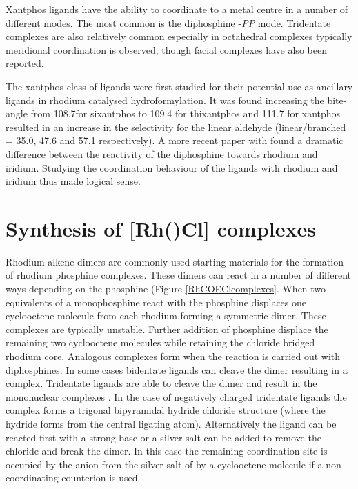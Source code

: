 

Xantphos ligands have the ability to coordinate to a metal centre in a number of different modes.  The most common is the diphosphine -\emph{PP\textprime} mode.  Tridentate complexes are also relatively common especially in octahedral complexes typically meridional \POP{} coordination is observed, though facial complexes have also been reported.\cite{Dallanegra2012, Pawley2012}

The xantphos class of ligands were first studied for their potential use as ancillary ligands in rhodium catalysed hydroformylation\cite{Kranenburg1995}.  It was found increasing the bite-angle from 108.7\degrees for sixantphos to 109.4 \degrees for thixantphos and 111.7 \degrees for xantphos resulted in an increase in the selectivity for the linear aldehyde (linear/branched = 35.0, 47.6 and 57.1 respectively).  A more recent paper with \iPrxantphos{} found a dramatic difference between the reactivity of the diphosphine towards rhodium and iridium.  Studying the coordination behaviour of the \tBuxantphos{} ligands with rhodium and iridium thus made logical sense.

\section{Synthesis of [Rh(\tBuxantphosk)Cl] complexes}
\label{section:rhodiumchloride}

Rhodium alkene dimers are commonly used starting materials for the formation of rhodium phosphine complexes.  These dimers can react in a number of different ways depending on the phosphine (Figure \ref{RhCOEClcomplexes}.  When two equivalents of a monophosphine react with  the phosphine displaces one cyclooctene molecule from each rhodium forming a symmetric dimer.\cite{Canepa2003}  These complexes are typically unstable.  Further addition of phosphine displace the remaining two cyclooctene molecules while retaining the chloride bridged rhodium core.\cite{Bleeke1986}  Analogous complexes form when the reaction is carried out with diphosphines.\cite{Fryzuk1989}  In some cases bidentate ligands can cleave the dimer resulting in a \ce{[Rh(LL)(COE)Cl]} complex.\cite{Hashimoto2010}  Tridentate ligands are able to cleave the dimer and result in the mononuclear complexes \ce{[Rh(LLL)Cl]}\cite{Khan1988, Hermann2002}.  In the case of negatively charged tridentate ligands the complex forms a trigonal bipyramidal hydride chloride structure (where the hydride forms from the central ligating atom).\cite{Boom1998, Winter2003, Salem2008}  Alternatively the ligand can be reacted first with a strong base or a silver salt can be added to remove the chloride and break the dimer.  In this case the remaining coordination site is occupied by the anion from the silver salt of by a cyclooctene molecule if a non-coordinating counterion is used.\cite{Fryzuk1986, Hanson2008}


